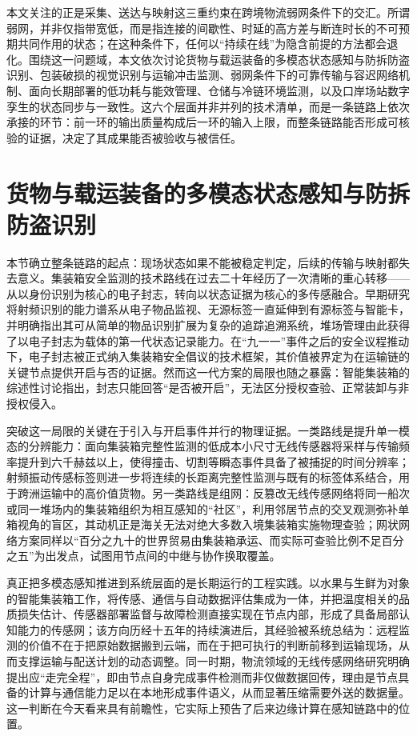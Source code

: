 \documentclass[11pt,a4paper]{article}
\begin{document}
本文关注的正是采集、送达与映射这三重约束在跨境物流弱网条件下的交汇。所谓弱网，并非仅指带宽低，而是指连接的间歇性、时延的高方差与断连时长的不可预期共同作用的状态；在这种条件下，任何以“持续在线”为隐含前提的方法都会退化。围绕这一问题域，本文依次讨论货物与载运装备的多模态状态感知与防拆防盗识别、包装破损的视觉识别与运输冲击监测、弱网条件下的可靠传输与容迟网络机制、面向长期部署的低功耗与能效管理、仓储与冷链环境监测，以及口岸场站数字孪生的状态同步与一致性。这六个层面并非并列的技术清单，而是一条链路上依次承接的环节：前一环的输出质量构成后一环的输入上限，而整条链路能否形成可核验的证据，决定了其成果能否被验收与被信任\cite{doisu152216014}。

\section{货物与载运装备的多模态状态感知与防拆防盗识别}

本节确立整条链路的起点：现场状态如果不能被稳定判定，后续的传输与映射都失去意义。集装箱安全监测的技术路线在过去二十年经历了一次清晰的重心转移——从以身份识别为核心的电子封志，转向以状态证据为核心的多传感融合。早期研究将射频识别的能力谱系从电子物品监视、无源标签一直延伸到有源标签与智能卡，并明确指出其可从简单的物品识别扩展为复杂的追踪追溯系统，堆场管理由此获得了以电子封志为载体的第一代状态记录能力\cite{doiindin2006275719}。在“九一一”事件之后的安全议程推动下，电子封志被正式纳入集装箱安全倡议的技术框架，其价值被界定为在运输链的关键节点提供开启与否的证据\cite{doiicmens20041508930}。然而这一代方案的局限也随之暴露：智能集装箱的综述性讨论指出，封志只能回答“是否被开启”，无法区分授权查验、正常装卸与非授权侵入\cite{doimasv1n3p16}。

突破这一局限的关键在于引入与开启事件并行的物理证据。一类路线是提升单一模态的分辨能力：面向集装箱完整性监测的低成本小尺寸无线传感器将采样与传输频率提升到六千赫兹以上，使得撞击、切割等瞬态事件具备了被捕捉的时间分辨率\cite{doisahcn20095168903}；射频振动传感标签则进一步将连续的长距离完整性监测与既有的标签体系结合，用于跨洲运输中的高价值货物\cite{doicoase20074341790}。另一类路线是组网：反篡改无线传感网络将同一船次或同一堆场内的集装箱组织为相互感知的“社区”，利用邻居节点的交叉观测弥补单箱视角的盲区，其动机正是海关无法对绝大多数入境集装箱实施物理查验\cite{doimed20095164585}；网状网络方案同样以“百分之九十的世界贸易由集装箱承运、而实际可查验比例不足百分之五”为出发点，试图用节点间的中继与协作换取覆盖\cite{doiths20084534429}。

真正把多模态感知推进到系统层面的是长期运行的工程实践。以水果与生鲜为对象的智能集装箱工作，将传感、通信与自动数据评估集成为一体，并把温度相关的品质损失估计、传感器部署监督与故障检测直接实现在节点内部，形成了具备局部认知能力的传感网\cite{doi0004705703510359}；该方向历经十五年的持续演进后，其经验被系统总结为：远程监测的价值不在于把原始数据搬到云端，而在于把可执行的判断前移到运输现场，从而支撑运输与配送计划的动态调整\cite{doi978303088662211}。同一时期，物流领域的无线传感网络研究明确提出应“走完全程”，即由节点自身完成事件检测而非仅做数据回传，理由是节点具备的计算与通信能力足以在本地形成事件语义，从而显著压缩需要外送的数据量\cite{doilcnw20136758496}。这一判断在今天看来具有前瞻性，它实际上预告了后来边缘计算在感知链路中的位置。
\end{document}
